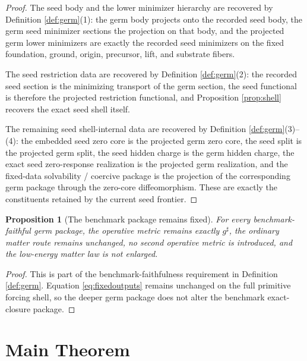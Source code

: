 \documentclass[11pt]{article}
\newcommand{\CompletedMetric}{g^{\sharp}}
\newtheorem{proposition}{Proposition}
\begin{document}
\begin{proof}
The seed body and the lower minimizer hierarchy are recovered by Definition \ref{def:germ}(1): the germ body projects onto the recorded seed body, the germ seed minimizer sections the projection on that body, and the projected germ lower minimizers are exactly the recorded seed minimizers on the fixed foundation, ground, origin, precursor, lift, and substrate fibers.

The seed restriction data are recovered by Definition \ref{def:germ}(2): the recorded seed section is the minimizing transport of the germ section, the seed functional is therefore the projected restriction functional, and Proposition \ref{prop:shell} recovers the exact seed shell itself.

The remaining seed shell-internal data are recovered by Definition \ref{def:germ}(3)--(4): the embedded seed zero core is the projected germ zero core, the seed split is the projected germ split, the seed hidden charge is the germ hidden charge, the exact seed zero-response realization is the projected germ realization, and the fixed-data solvability / coercive package is the projection of the corresponding germ package through the zero-core diffeomorphism. These are exactly the constituents retained by the current seed frontier.
\end{proof}

\begin{proposition}[The benchmark package remains fixed]
\label{prop:boundary}
For every benchmark-faithful germ package, the operative metric remains exactly \(\CompletedMetric\), the ordinary matter route remains unchanged, no second operative metric is introduced, and the low-energy matter law is not enlarged.
\end{proposition}

\begin{proof}
This is part of the benchmark-faithfulness requirement in Definition \ref{def:germ}. Equation \eqref{eq:fixedoutputs} remains unchanged on the full primitive forcing shell, so the deeper germ package does not alter the benchmark exact-closure package.
\end{proof}

\section{Main Theorem}
\end{document}
